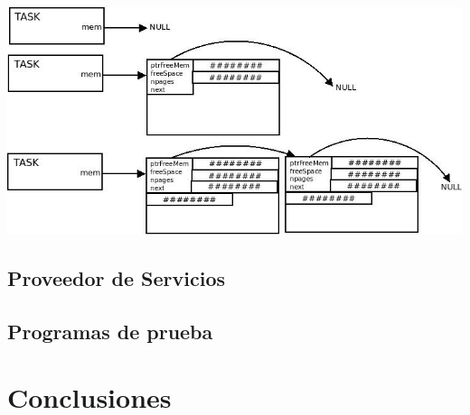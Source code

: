 \documentclass[a4paper,10pt]{article}
\begin{document}
\begin{center}
 \includegraphics[scale=0.45]{./malloc.jpeg}
\end{center}

\subsection{Proveedor de Servicios}

\subsection{Programas de prueba}


\newpage
\section{Conclusiones}

\bigskip
\end{document}
